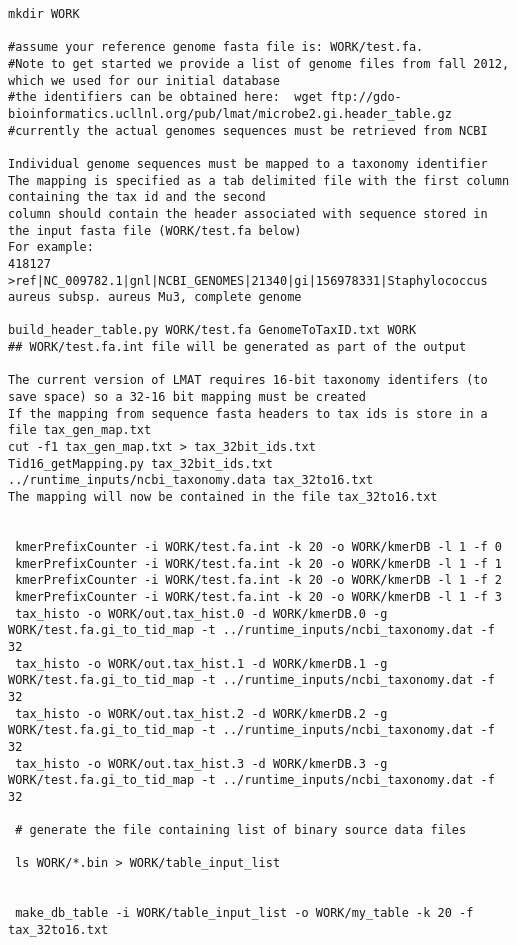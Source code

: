 \documentclass[11pt]{article}
\begin{document}
\begin{verbatim}
mkdir WORK

#assume your reference genome fasta file is: WORK/test.fa.
#Note to get started we provide a list of genome files from fall 2012, which we used for our initial database
#the identifiers can be obtained here:  wget ftp://gdo-bioinformatics.ucllnl.org/pub/lmat/microbe2.gi.header_table.gz
#currently the actual genomes sequences must be retrieved from NCBI

Individual genome sequences must be mapped to a taxonomy identifier
The mapping is specified as a tab delimited file with the first column containing the tax id and the second
column should contain the header associated with sequence stored in the input fasta file (WORK/test.fa below)
For example:
418127   >ref|NC_009782.1|gnl|NCBI_GENOMES|21340|gi|156978331|Staphylococcus aureus subsp. aureus Mu3, complete genome

build_header_table.py WORK/test.fa GenomeToTaxID.txt WORK
## WORK/test.fa.int file will be generated as part of the output

The current version of LMAT requires 16-bit taxonomy identifers (to save space) so a 32-16 bit mapping must be created
If the mapping from sequence fasta headers to tax ids is store in a file tax_gen_map.txt
cut -f1 tax_gen_map.txt > tax_32bit_ids.txt
Tid16_getMapping.py tax_32bit_ids.txt ../runtime_inputs/ncbi_taxonomy.data tax_32to16.txt
The mapping will now be contained in the file tax_32to16.txt


 kmerPrefixCounter -i WORK/test.fa.int -k 20 -o WORK/kmerDB -l 1 -f 0
 kmerPrefixCounter -i WORK/test.fa.int -k 20 -o WORK/kmerDB -l 1 -f 1
 kmerPrefixCounter -i WORK/test.fa.int -k 20 -o WORK/kmerDB -l 1 -f 2
 kmerPrefixCounter -i WORK/test.fa.int -k 20 -o WORK/kmerDB -l 1 -f 3
 tax_histo -o WORK/out.tax_hist.0 -d WORK/kmerDB.0 -g WORK/test.fa.gi_to_tid_map -t ../runtime_inputs/ncbi_taxonomy.dat -f 32
 tax_histo -o WORK/out.tax_hist.1 -d WORK/kmerDB.1 -g WORK/test.fa.gi_to_tid_map -t ../runtime_inputs/ncbi_taxonomy.dat -f 32
 tax_histo -o WORK/out.tax_hist.2 -d WORK/kmerDB.2 -g WORK/test.fa.gi_to_tid_map -t ../runtime_inputs/ncbi_taxonomy.dat -f 32
 tax_histo -o WORK/out.tax_hist.3 -d WORK/kmerDB.3 -g WORK/test.fa.gi_to_tid_map -t ../runtime_inputs/ncbi_taxonomy.dat -f 32

 # generate the file containing list of binary source data files

 ls WORK/*.bin > WORK/table_input_list


 make_db_table -i WORK/table_input_list -o WORK/my_table -k 20 -f tax_32to16.txt
\end{verbatim}
\end{document}
